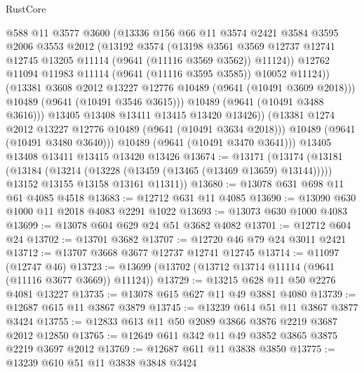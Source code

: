 \begin{lexlean}{RustCore}
\begin{coremodule}
                  @588
                  @11
                  @3577
                  @3600
                  (@13336
                    @156
                    @66
                    @11
                    @3574
                    @2421
                    @3584
                    @3595
                    @2006
                    @3553
                    @2012
                    (@13192
                      @3574
                      (@13198
                        @3561
                        @3569
                        @12737
                        @12741
                        @12745
                        @13205
                        @11114
                        (@9641 (@11116 @3569 @3562))
                        @11124))
                    @12762
                    @11094
                    @11983
                    @11114
                    (@9641 (@11116 @3595 @3585))
                    @10052
                    @11124))
                (@13381 @3608 @2012 @13227 @12776 @10489 (@9641 (@10491 @3609 @2018)))
                @10489
                (@9641 (@10491 @3546 @3615)))
              @10489
              (@9641 (@10491 @3488 @3616)))
            @13405
            @13408
            @13411
            @13415
            @13420
            @13426))
        (@13381 @1274 @2012 @13227 @12776 @10489 (@9641 (@10491 @3634 @2018)))
        @10489
        (@9641 (@10491 @3480 @3640)))
      @10489
      (@9641 (@10491 @3470 @3641)))
    @13405
    @13408
    @13411
    @13415
    @13420
    @13426
@13674 := @13171
    (@13174
      (@13181
        (@13184 (@13214 (@13228 (@13459 (@13465 (@13469 @13659) @13144)))))
        @13152
        @13155
        @13158
        @13161
        @11311))
@13680 := @13078 @631 @698 @11 @61 @4085 @4518
@13683 := @12712 @631 @11 @4085
@13690 := @13090 @630 @1000 @11 @2018 @4083 @2291 @1022
@13693 := @13073 @630 @1000 @4083
@13699 := @13078 @604 @629 @24 @51 @3682 @4082
@13701 := @12712 @604 @24
@13702 := @13701 @3682
@13707 := @12720 @46 @79 @24 @3011 @2421
@13712 := @13707 @3668 @3677 @12737 @12741 @12745
@13714 := @11097 (@12747 @46)
@13723 := @13699 (@13702 (@13712 @13714 @11114 (@9641 (@11116 @3677 @3669)) @11124))
@13729 := @13215 @628 @11 @50 @2276 @4081 @13227
@13735 := @13078 @615 @627 @11 @49 @3881 @4080
@13739 := @12687 @615 @11 @3867 @3879
@13745 := @13239 @614 @51 @11 @3867 @3877 @3424
@13755 := @12833 @613 @11 @50 @2089 @3866 @3876 @2219 @3687 @2012 @12850
@13765 := @12649 @611 @342 @11 @49 @3852 @3865 @3875 @2219 @3697 @2012
@13769 := @12687 @611 @11 @3838 @3850
@13775 := @13239 @610 @51 @11 @3838 @3848 @3424

\end{coremodule}
\end{lexlean}
